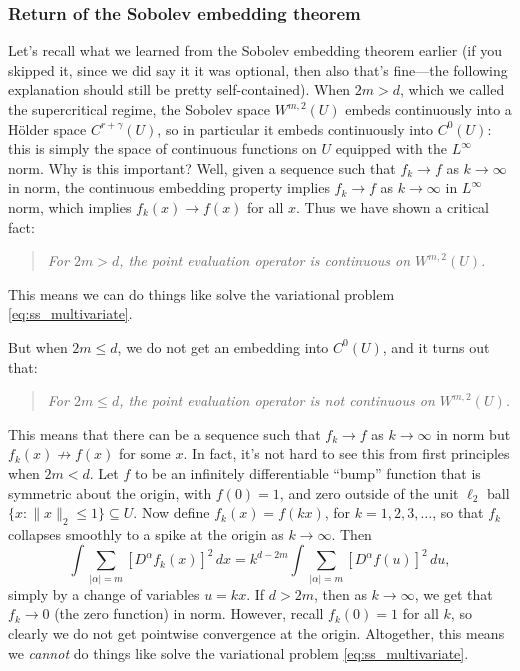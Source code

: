 \documentclass{article}
\begin{document}
\subsubsection{Return of the Sobolev embedding theorem}

Let's recall what we learned from the Sobolev embedding theorem earlier (if you
skipped it, since we did say it it was optional, then also that's fine---the
following explanation should still be pretty self-contained). When $2m > d$,
which we called the supercritical regime, the Sobolev space $W^{m,2}(U)$ embeds
continuously into a H{\"o}lder space $C^{r+\gamma}(U)$, so in particular it
embeds continuously into $C^0(U)$: this is simply the space of continuous
functions on $U$ equipped with the $L^\infty$ norm. %
Why is this important? Well, given a sequence such that $f_k \to f$ as $k \to
\infty$ in  norm, the continuous embedding
property implies $f_k \to f$ as $k \to \infty$ in $L^\infty$ norm, which implies
$f_k(x) \to f(x)$ for all $x$. Thus we have shown a critical fact:
\begin{quote}
\centering\it
For $2m > d$, the point evaluation operator is continuous on $W^{m,2}(U)$.   
\end{quote}
This means we can do things like solve the variational problem
\eqref{eq:ss_multivariate}. 

But when $2m \leq d$, we do not get an embedding into $C^0(U)$, and it turns out
that:   
\begin{quote}
\centering\it
For $2m \leq d$, the point evaluation operator is not continuous on
$W^{m,2}(U)$.  
\end{quote}
This means that there can be a sequence such that $f_k \to f$ as $k \to \infty$
in  norm but $f_k(x) \not\to f(x)$ for some
$x$. In fact, it's not hard to see this from first principles when $2m < d$.
Let $f$ to be an infinitely differentiable ``bump'' function that is symmetric
about the origin, with $f(0) = 1$, and zero outside of the unit $\ell_2$ ball
$\{x : \|x\|_2 \leq 1\} \subseteq U$. Now define $f_k(x) = f(k x)$, for
$k=1,2,3,\dots$, so that $f_k$ collapses smoothly to a spike at the origin as $k 
\to \infty$. Then
\[
\int \sum_{|\alpha| = m} [D^\alpha f_k(x)]^2 \, dx = 
k^{d-2m} \int \sum_{|\alpha| = m} [D^\alpha f(u)]^2 \, du, 
\]
simply by a change of variables $u = k x$. If $d > 2m$, then as $k \to \infty$,
we get that $f_k \to 0$ (the zero function) in 
norm. However, recall $f_k(0) = 1$ for all $k$, so clearly we do not get
pointwise convergence at the origin. Altogether, this means we \emph{cannot} do
things like solve the variational problem \eqref{eq:ss_multivariate}.  
\end{document}
